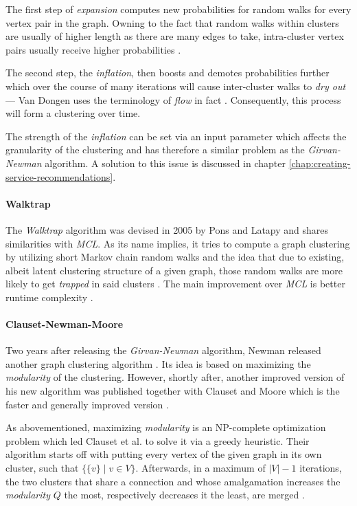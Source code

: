 \documentclass[12pt,a4paper]{report}
\begin{document}
The first step of \textit{expansion} computes new probabilities for random walks
for every vertex pair in the graph. Owning to the fact that random walks within
clusters are usually of higher length as there are many edges to take, intra-cluster
vertex pairs usually receive higher probabilities \cite{vandongen2000graph}.

The second step, the \textit{inflation}, then boosts and demotes probabilities
further which over the course of many iterations will cause inter-cluster walks
to \textit{dry out} --- Van Dongen uses the terminology of \textit{flow} in fact
\cite{vandongen2000graph}. Consequently, this process will form a clustering
over time.

The strength of the \textit{inflation} can be set via an input parameter which
affects the granularity of the clustering and has therefore a similar problem
as the \textit{Girvan-Newman} algorithm. A solution to this issue is discussed
in chapter \ref{chap:creating-service-recommendations}.

\paragraph{Walktrap \cite{pons2005computing}}
The \textit{Walktrap} algorithm was devised in 2005 by Pons and Latapy
\cite{pons2005computing} and shares similarities with \textit{MCL}.
As its name implies, it tries to compute a graph clustering by utilizing short
Markov chain random walks and the idea that due to existing, albeit latent
clustering structure of a given graph, those random walks are more likely
to get \textit{trapped} in said clusters \cite{pons2005computing}.
The main improvement over \textit{MCL} is better runtime complexity
\cite{pons2005computing}.

\paragraph{Clauset-Newman-Moore \cite{clauset2004modularity}}
Two years after releasing the \textit{Girvan-Newman} algorithm, Newman
released another graph clustering algorithm \cite{newman2004fast}.
Its idea is based on maximizing the \textit{modularity} of the clustering.
However, shortly after, another improved version of his new algorithm
was published together with Clauset and Moore which is the
faster and generally improved version \cite{clauset2004modularity}.

As abovementioned, maximizing \textit{modularity} is an NP-complete
optimization problem which led Clauset et al. to solve it via a greedy heuristic.
Their algorithm starts off with putting every vertex of the given graph in its
own cluster, such that \(\{\{v\} \mid v \in V\}\).
Afterwards, in a maximum of \(\vert V \vert - 1\) iterations, the two clusters
that share a connection and whose amalgamation increases the \textit{modularity}
\(Q\) the most, respectively decreases it the least, are merged
\cite{clauset2004modularity}.
\end{document}
